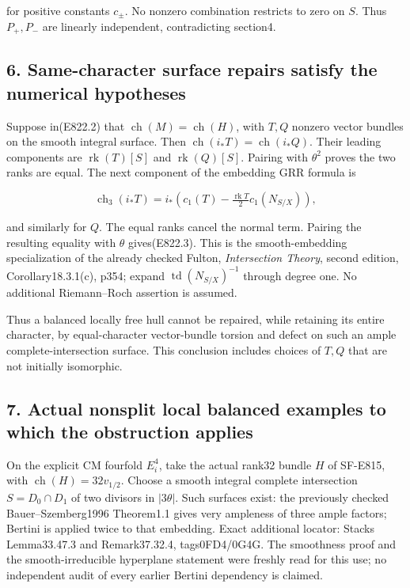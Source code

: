 for positive constants \(c_\pm\). No nonzero combination restricts to
zero on \(S\). Thus \(P_+,P_-\) are linearly independent, contradicting
section4.

\subsection{6. Same-character surface repairs satisfy the numerical
hypotheses}\label{SF-E822-same-character-surface-repairs-satisfy-the-numerical-hypotheses}

Suppose in(E822.2) that \(\operatorname{ch}(M)=\operatorname{ch}(H)\),
with \(T,Q\) nonzero vector bundles on the smooth integral surface. Then
\(\operatorname{ch}(i_*T)=\operatorname{ch}(i_*Q)\). Their leading
components are \(\operatorname{rk}(T)[S]\) and
\(\operatorname{rk}(Q)[S]\). Pairing with \(\theta^2\) proves the two
ranks are equal. The next component of the embedding GRR formula is

\[
 \operatorname{ch}_3(i_*T)
   =i_*\left(c_1(T)-\tfrac{\operatorname{rk}T}{2}c_1(N_{S/X})\right),
 \tag{E822.13}
\]

and similarly for \(Q\). The equal ranks cancel the normal term. Pairing
the resulting equality with \(\theta\) gives(E822.3). This is the
smooth-embedding specialization of the already checked Fulton,
\emph{Intersection Theory}, second edition, Corollary18.3.1(c), p354;
expand \(\operatorname{td}(N_{S/X})^{-1}\) through degree one. No
additional Riemann--Roch assertion is assumed.

Thus a balanced locally free hull cannot be repaired, while retaining
its entire character, by equal-character vector-bundle torsion and
defect on such an ample complete-intersection surface. This conclusion
includes choices of \(T,Q\) that are not initially isomorphic.

\subsection{7. Actual nonsplit local balanced examples to which the
obstruction
applies}\label{SF-E822-actual-nonsplit-local-balanced-examples-to-which-the-obstruction-applies}

On the explicit CM fourfold \(E_i^4\), take the actual rank32 bundle
\(H\) of SF-E815, with \(\operatorname{ch}(H)=32v_{1/2}\). Choose a
smooth integral complete intersection \(S=D_0\cap D_1\) of two divisors
in \(|3\theta|\). Such surfaces exist: the previously checked
Bauer--Szemberg1996 Theorem1.1 gives very ampleness of three ample
factors; Bertini is applied twice to that embedding. Exact additional
locator: Stacks Lemma33.47.3 and Remark37.32.4, tags0FD4/0G4G. The
smoothness proof and the smooth-irreducible hyperplane statement were
freshly read for this use; no independent audit of every earlier Bertini
dependency is claimed.

